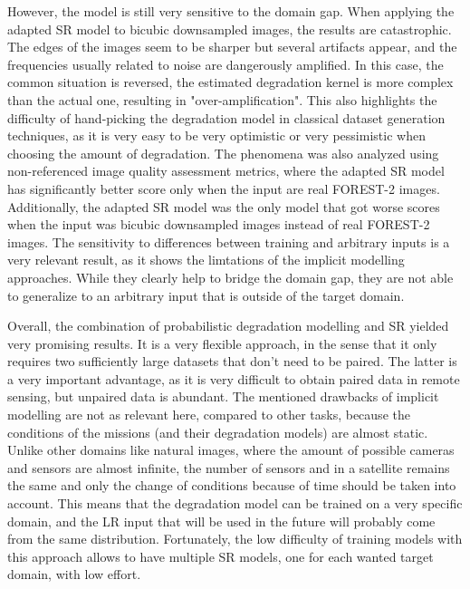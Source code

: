 However, the model is still very sensitive to the domain gap. 
When applying the adapted SR model to bicubic downsampled images, the results are catastrophic.
The edges of the images seem to be sharper but several artifacts appear, and the frequencies usually related to noise are dangerously amplified. 
In this case, the common situation is reversed, the estimated degradation kernel is more complex than the actual one, resulting in "over-amplification". This also highlights the difficulty of hand-picking the degradation model in classical dataset generation techniques, as it is very easy to be very optimistic or very pessimistic when choosing the amount of degradation.
The phenomena was also analyzed using non-referenced image quality assessment metrics, where the adapted SR model has significantly better score only when the input are real FOREST-2 images. Additionally, the adapted SR model was the only model that got worse scores when the input was bicubic downsampled images instead of real FOREST-2 images.
The sensitivity to differences between training and arbitrary inputs is a very relevant result, as it shows the limtations of the implicit modelling approaches. While they clearly help to bridge the domain gap, they are not able to generalize to an arbitrary input that is outside of the target domain.


Overall, the combination of probabilistic degradation modelling and SR yielded very promising results. It is a very flexible approach, in the sense that it only requires two sufficiently large datasets that  don't need to be paired. The latter is a very important advantage, as it is very difficult to obtain paired data in remote sensing, but unpaired data is abundant. The mentioned drawbacks of implicit modelling are not as relevant here, compared to other tasks, because the conditions of the missions (and their degradation models) are almost static. Unlike other domains like natural images, where the amount of possible cameras and sensors are almost infinite, the number of sensors and in a satellite remains the same and only the change of conditions because of time should be taken into account. This means that the degradation model can be trained on a very specific domain, and the LR input that will be used in the future will probably come from the same distribution.
Fortunately, the low difficulty of training models with this approach allows to have multiple SR models, one for each wanted target domain, with low effort.


